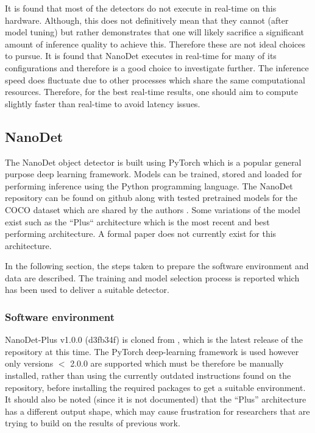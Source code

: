 \documentclass[a4paper,twoside,12pt]{report}
\begin{document}
It is found that most of the detectors do not execute in real-time on this hardware. Although, this does not definitively mean that they cannot (after model tuning) but rather demonstrates that one will likely sacrifice a significant amount of inference quality to achieve this. Therefore these are not ideal choices to pursue. It is found that NanoDet executes in real-time for many of its configurations and therefore is a good choice to investigate further. The inference speed does fluctuate due to other processes which share the same computational resources. Therefore, for the best real-time results, one should aim to compute slightly faster than real-time to avoid latency issues. 

\subsection{NanoDet}

The NanoDet object detector is built using PyTorch which is a popular general purpose deep learning framework. Models can be trained, stored and loaded for performing inference using the Python programming language. The NanoDet repository can be found on github along with tested pretrained models for the COCO dataset which are shared by the authors \citep{nanodet}. Some variations of the model exist such as the ``Plus`` architecture which is the most recent and best performing architecture. A formal paper does not currently exist for this architecture.

In the following section, the steps taken to prepare the software environment and data are described. The training and model selection process is reported which has been used to deliver a suitable detector.

\subsubsection{Software environment}

NanoDet-Plus v1.0.0 (d3fb34f) is cloned from \cite{nanodet}, which is the latest release of the repository at this time. The PyTorch deep-learning framework is used however only versions $<$ 2.0.0 are supported which must be therefore be manually installed, rather than using the currently outdated instructions found on the repository, before installing the required packages to get a suitable environment. It should also be noted (since it is not documented) that the ``Plus'' architecture has a different output shape, which may cause frustration for researchers that are trying to build on the results of previous work.
\end{document}
